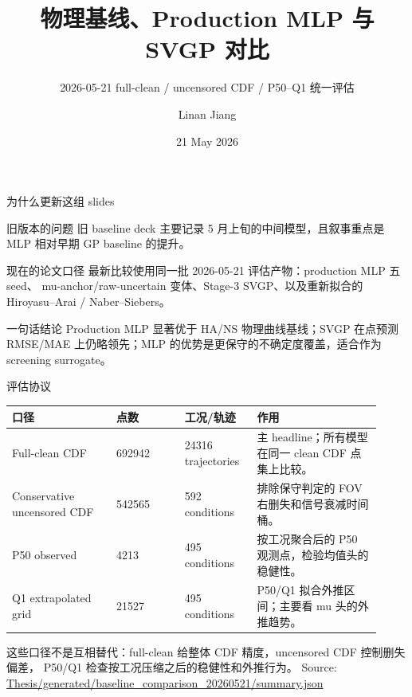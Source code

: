 \documentclass[aspectratio=169,11pt]{beamer}
\title[Baseline Comparison]{物理基线、Production MLP 与 SVGP 对比}
\subtitle{2026-05-21 full-clean / uncensored CDF / P50--Q1 统一评估}
\author{Linan Jiang}
\institute{Aalto University}
\date{21 May 2026}
\newcommand{\good}[1]{\textcolor{goodGreen}{#1}}
\newcommand{\src}[1]{\vfill{\tiny\textcolor{gray!70!black}{Source: \url{#1}}}}
\begin{document}
\begin{frame}
  \titlepage
\end{frame}

\begin{frame}{为什么更新这组 slides}
\small
\begin{block}{旧版本的问题}
旧 baseline deck 主要记录 5 月上旬的中间模型，且叙事重点是 MLP 相对早期
GP baseline 的提升。
\end{block}

\begin{block}{现在的论文口径}
最新比较使用同一批 2026-05-21 评估产物：production MLP 五 seed、
mu-anchor/raw-uncertain 变体、Stage-3 SVGP、以及重新拟合的
Hiroyasu--Arai / Naber--Siebers。
\end{block}

\begin{block}{一句话结论}
\good{Production MLP 显著优于 HA/NS 物理曲线基线；SVGP 在点预测 RMSE/MAE
上仍略领先；MLP 的优势是更保守的不确定度覆盖，适合作为 screening surrogate。}
\end{block}
\end{frame}

\begin{frame}{评估协议}
\small
\begin{tabular}{L{0.26\linewidth}R{0.17\linewidth}R{0.18\linewidth}L{0.31\linewidth}}
\toprule
口径 & 点数 & 工况/轨迹 & 作用 \\
\midrule
Full-clean CDF & \num{692942} & \num{24316} trajectories & 主 headline；所有模型在同一 clean CDF 点集上比较。 \\
Conservative uncensored CDF & \num{542565} & 592 conditions & 排除保守判定的 FOV 右删失和信号衰减时间桶。 \\
P50 observed & \num{4213} & 495 conditions & 按工况聚合后的 P50 观测点，检验均值头的稳健性。 \\
Q1 extrapolated grid & \num{21527} & 495 conditions & P50/Q1 拟合外推区间；主要看 mu 头的外推趋势。 \\
\bottomrule
\end{tabular}

\vspace{0.6em}
\footnotesize
这些口径不是互相替代：full-clean 给整体 CDF 精度，uncensored CDF 控制删失偏差，
P50/Q1 检查按工况压缩之后的稳健性和外推行为。
\src{Thesis/generated/baseline_comparison_20260521/summary.json}
\end{frame}
\end{document}
